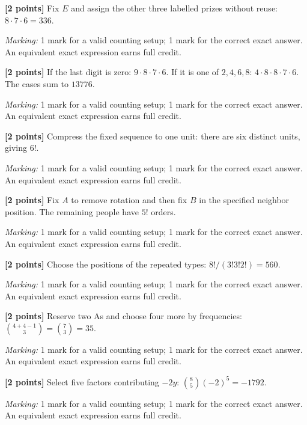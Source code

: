 \documentclass[12pt,letterpaper]{article}
\begin{document}
\begin{description}[font=\normalfont,leftmargin=1.2em,labelsep=0.4em]
\item[(a)] \textbf{[2 points]} Fix $E$ and assign the other three labelled prizes without reuse: $8\cdot7\cdot6=336$.
\par\textit{Marking:} 1 mark for a valid counting setup; 1 mark for the correct exact answer. An equivalent exact expression earns full credit.
\item[(b)] \textbf{[2 points]} If the last digit is zero: $9\cdot8\cdot7\cdot6$. If it is one of $2,4,6,8$: $4\cdot8\cdot8\cdot7\cdot6$. The cases sum to $13776$.
\par\textit{Marking:} 1 mark for a valid counting setup; 1 mark for the correct exact answer. An equivalent exact expression earns full credit.
\item[(c)] \textbf{[2 points]} Compress the fixed sequence to one unit: there are six distinct units, giving $6!$.
\par\textit{Marking:} 1 mark for a valid counting setup; 1 mark for the correct exact answer. An equivalent exact expression earns full credit.
\item[(d)] \textbf{[2 points]} Fix $A$ to remove rotation and then fix $B$ in the specified neighbor position. The remaining people have $5!$ orders.
\par\textit{Marking:} 1 mark for a valid counting setup; 1 mark for the correct exact answer. An equivalent exact expression earns full credit.
\item[(e)] \textbf{[2 points]} Choose the positions of the repeated types: $8!/(3!3!2!)=560$.
\par\textit{Marking:} 1 mark for a valid counting setup; 1 mark for the correct exact answer. An equivalent exact expression earns full credit.
\item[(f)] \textbf{[2 points]} Reserve two As and choose four more by frequencies: $\binom{4+4-1}{3}=\binom73=35$.
\par\textit{Marking:} 1 mark for a valid counting setup; 1 mark for the correct exact answer. An equivalent exact expression earns full credit.
\item[(g)] \textbf{[2 points]} Select five factors contributing $-2y$: $\binom85(-2)^5=-1792$.
\par\textit{Marking:} 1 mark for a valid counting setup; 1 mark for the correct exact answer. An equivalent exact expression earns full credit.

\end{description}
\end{document}
